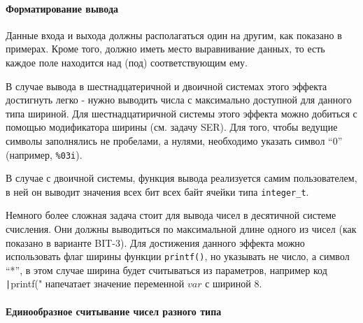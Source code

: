 \paragraph{Форматирование вывода}
Данные входа и выхода должны располагаться один на другим, как показано в примерах. Кроме того, должно иметь место выравнивание данных, то есть каждое поле находится над (под) соответствующим ему. 

В случае вывода в шестнадцатеричной и двоичной системах этого эффекта достигнуть легко - нужно выводить числа с максимально доступной для данного типа шириной. Для шестнадцатиричной системы этого эффекта можно добиться с помощью модификатора ширины (см. задачу SER). Для того, чтобы ведущие символы заполнялись не пробелами, а нулями, необходимо указать символ ``0'' (например, \verb|%03i|).

В случае с двоичной системы, функция вывода реализуется самим пользователем, в ней он выводит значения всех бит всех байт ячейки типа \texttt{integer\_t}.

Немного более сложная задача стоит для вывода чисел в десятичной системе счисления. Они должны выводиться по максимальной длине одного из чисел (как показано в варианте BIT-3). Для достижения данного эффекта можно использовать флаг ширины функции \texttt{printf()}, но указывать не число, а символ ``*'', в этом случае ширина будет считываться из параметров, например код \texttt|printf("%
напечатает значение переменной $var$ с шириной 8.
\begin{comment}
\begin{itemize}
    \item Здесь гораздо подробнее надо остановиться на \texttt{integer\_t}, как его нужно универсально использовать, пользуясь sizeof и прочими средствами. 
    
    \item Объяснить про считывание с клавиатуры, про тип MaxInt. Рассмотреть приведение типов, а то они не понимают ничерта в этом, тупят ужасно.
    \item Показать на наглядном примерчике с картинкой в памяти как выставить бит, например, или как выставить байт в числе. Как "склеить" числа.
    \item Кроме того, научить их выводить числа в правильном формате. Нужно ли объяснять про двоичную что-то?
\end{itemize}
\end{comment}
\paragraph{Единообразное считывание чисел разного типа}

